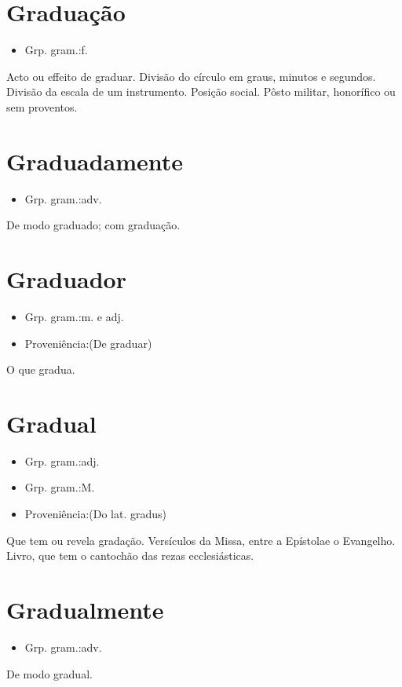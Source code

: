 \section{Graduação}
\begin{itemize}
\item {Grp. gram.:f.}
\end{itemize}
Acto ou effeito de graduar.
Divisão do círculo em graus, minutos e segundos.
Divisão da escala de um instrumento.
Posição social.
Pôsto militar, honorífico ou sem proventos.
\section{Graduadamente}
\begin{itemize}
\item {Grp. gram.:adv.}
\end{itemize}
De modo graduado; com graduação.
\section{Graduador}
\begin{itemize}
\item {Grp. gram.:m.  e  adj.}
\end{itemize}
\begin{itemize}
\item {Proveniência:(De \textunderscore graduar\textunderscore )}
\end{itemize}
O que gradua.
\section{Gradual}
\begin{itemize}
\item {Grp. gram.:adj.}
\end{itemize}
\begin{itemize}
\item {Grp. gram.:M.}
\end{itemize}
\begin{itemize}
\item {Proveniência:(Do lat. \textunderscore gradus\textunderscore )}
\end{itemize}
Que tem ou revela gradação.
Versículos da Missa, entre a \textunderscore Epístola\textunderscore  e o \textunderscore Evangelho\textunderscore .
Livro, que tem o cantochão das rezas ecclesiásticas.
\section{Gradualmente}
\begin{itemize}
\item {Grp. gram.:adv.}
\end{itemize}
De modo gradual.
